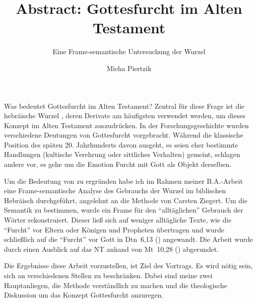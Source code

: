\documentclass[headings=standardclasses]{scrartcl}
\author{Micha Piertzik}
\title{Abstract: Gottesfurcht im Alten Testament}
\subtitle{Eine Frame-semantische Untersuchung der Wurzel \heb{ירא}}
\begin{document}
\maketitle


Was bedeutet Gottesfurcht im Alten Testament? Zentral für diese Frage ist die hebräische Wurzel , deren Derivate am häufigsten verwendet werden, um dieses Konzept im Alten Testament auszudrücken. In der Forschungsgeschichte wurden verschiedene Deutungen von Gottesfurcht vorgebracht. Während die klassische Position des späten 20. Jahrhunderts davon ausgeht, es seien eher bestimmte Handlungen (kultische Verehrung oder sittliches Verhalten) gemeint, schlagen andere vor, es gehe um die Emotion Furcht mit Gott als Objekt derselben.

Um die Bedeutung von  zu ergründen habe ich im Rahmen meiner B.A.-Arbeit eine Frame-semantische Analyse des Gebrauchs der Wurzel im biblischen Hebräisch durchgeführt, angelehnt an die Methode von Carsten Ziegert.
Um die Semantik zu bestimmen, wurde ein Frame für den \enquote{alltäglichen} Gebrauch der Wörter rekonstruiert.
Dieser ließ sich auf weniger alltägliche Texte, wie die \enquote{Furcht} vor Eltern oder Königen und Propheten übertragen und wurde schließlich auf die \enquote{Furcht} vor Gott in Dtn~6,13 () angewandt.
Die Arbeit wurde durch einen Ausblick auf das NT anhand von Mt~10,28 () abgerundet.

Die Ergebnisse diese Arbeit vorzustellen, ist Ziel des Vortrags.
Es wird nötig sein, sich an verschiedenen Stellen zu beschränken.
Dabei sind meine zwei Hauptanliegen, die Methode verständlich zu machen und die theologische Diskussion um das Konzept Gottesfurcht anzuregen.

\nocite{Becker1965}
\nocite{Fuhs1982}
\nocite{Kipfer2016}

\printbibliography
\end{document}
